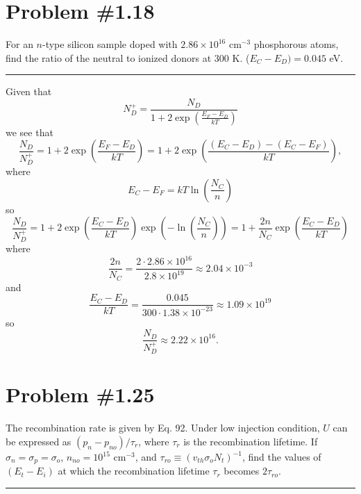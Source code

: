 \documentclass{article}
\newcommand{\horline}
           {\begin{center}
              \noindent\rule{8cm}{0.4pt}
            \end{center}}
\begin{document}
\section*{Problem \#1.18}
For an $n$-type silicon sample doped with $2.86 \times 10^{16}$ cm$^{-3}$
phosphorous atoms, find the ratio of the neutral to ionized donors at 300 K.
($E_C - E_D) = 0.045$ eV.
\horline
Given that
$$
N_D^+ = \frac{N_D}{1 + 2 \exp \left(\frac{E_F - E_D}{kT}\right)}
$$
we see that
$$
\frac{N_D}{N_D^+} = 1 + 2 \exp \left(\frac{E_F - E_D}{kT}\right) 
                  = 1 + 2 \exp \left(\frac{(E_C - E_D) - (E_C - E_F)}{kT}\right), 
$$
where
$$
E_C - E_F = kT \ln \left(\frac{N_C}{n}\right)
$$
so
$$
\frac{N_D}{N_D^+} = 1 + 2 \exp \left(\frac{E_C - E_D}{kT}\right) 
                          \exp \left(-\ln\left(\frac{N_C}{n}\right)\right)
                  = 1 + \frac{2 n}{N_C} \exp \left(\frac{E_C - E_D}{kT}\right)
$$
where
$$
\frac{2n}{N_C} = \frac{2 \cdot 2.86 \times 10^{16}}{2.8 \times 10^{19}} 
  \approx 2.04 \times 10^{-3}
$$
and
$$
\frac{E_C - E_D}{kT} = \frac{0.045}{300 \cdot 1.38 \times 10^{-23}} 
  \approx 1.09 \times 10^{19}
$$
so
$$
\frac{N_D}{N_D^+} \approx 2.22 \times 10^16.
$$

\pagebreak
\section*{Problem \#1.25}
The recombination rate is given by Eq. 92. Under low injection condition, $U$
can be expressed as $(p_n - p_{no})/\tau_r$, where $\tau_r$ is the 
recombination lifetime. If $\sigma_n = \sigma_p = \sigma_o$, 
$n_{no} = 10^{15}$ cm$^{-3}$, and 
$\tau_{ro} \equiv (v_{th} \sigma_o N_t)^{-1}$, find the values of 
$(E_t - E_i)$ at which the recombination lifetime $\tau_r$ becomes
$2 \tau_{ro}$.
\horline
\end{document}
